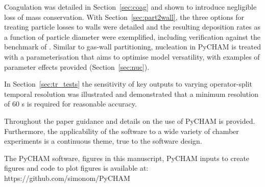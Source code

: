 \documentclass[gmd, manuscript]{copernicus}
\begin{document}
Coagulation was detailed in Section~\ref{sec:coag} and shown to introduce negligible loss of mass conservation.  With Section~\ref{sec:part2wall}, the three options for treating particle losses to walls were detailed and the resulting deposition rates as a function of particle diameter were exemplified, including verification against the benchmark of \citet{McMurry1985}.  Similar to gas-wall partitioning, nucleation in PyCHAM is treated with a parameterisation that aims to optimise model versatility, with examples of parameter effects provided (Section~\ref{sec:nuc}).

In Section~\ref{sec:tr_tests} the sensitivity of key outputs to varying operator-split temporal resolution was illustrated and demonstrated that a minimum resolution of 60 s is required for reasonable accuracy.

Throughout the paper guidance and details on the use of PyCHAM is provided.  Furthermore, the applicability of the software to a wide variety of chamber experiments is a continuous theme, true to the software design.



\codedataavailability %

 The PyCHAM software, figures in this manuscript, PyCHAM inputs to create figures and code to plot figures is available at: https://github.com/simonom/PyCHAM

\appendix
\section{}    %

\subsection{}     %


\noappendix       %



\end{document}
